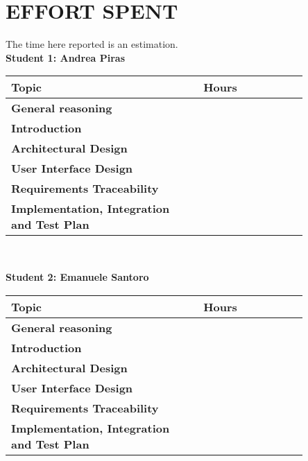 \chapter{EFFORT SPENT}
\label{ch:effort}%
The time here reported is an estimation.
\\[10pt]
\textbf {Student 1: Andrea Piras}

\begin{table}[H]
\centering 
    \begin{tabular}{| p{0.55\linewidth} | p{0.30\linewidth} |}
    \hline
    \rowcolor{bluepoli!40}
    \textbf{Topic} & \textbf{Hours}\T\B \\    
    \hline \hline
    \textbf{General reasoning} & \T\B \\
    \hline 
    \textbf{Introduction} &  \T\B \\
    \hline 
    \textbf{Architectural Design} & \T\B \\
    \hline 
    \textbf{User Interface Design} & \T\B \\
    \hline 
    \textbf{Requirements Traceability} &  \T\B \\
    \hline
    \textbf{Implementation, Integration and Test Plan} &  \T\B \\
    \hline
    \end{tabular}
    \\[10pt]
\end{table}

\textbf {Student 2: Emanuele Santoro}
\begin{table}[H]
\centering 
    \begin{tabular}{| p{0.55\linewidth} | p{0.30\linewidth} |}
    \hline
    \rowcolor{bluepoli!40}
    \textbf{Topic} & \textbf{Hours}\T\B \\    
    \hline \hline
    \textbf{General reasoning} & \T\B \\
    \hline 
    \textbf{Introduction} &  \T\B \\
    \hline 
    \textbf{Architectural Design} &  \T\B \\
    \hline 
    \textbf{User Interface Design} & \T\B \\
    \hline 
    \textbf{Requirements Traceability} &  \T\B \\
    \hline
    \textbf{Implementation, Integration and Test Plan} & \T\B \\
    \hline
    \end{tabular}
    \\[10pt]
\end{table}

